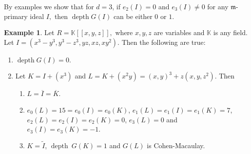 \documentclass[reqno,a4paper,dvipsnames]{amsart}
\newcommand{\kk}{\mathbb{K}}
\newcommand{\depth}{\operatorname{depth}}
\theoremstyle{definition}
\newtheorem{example}[theorem]{Example}
\begin{document}
By  examples we show that  for $d=3$, if $e_2(I)=0$ and $e_3(I) \neq 0$ for any $\mathfrak m$-primary ideal $I,$ then  $\depth G(I)$ can be either $0$ or $1$.  
\begin{example}
\label{e2=0, e3 not 0}
Let  $R =\kk [[x,y,z]],$ where $x,y,z$ are variables and $\mathbb K$ is any field.
   Let $I =  (x^3-y^3,  y^{3}-z^{3}, yz, xz, xy^{2})$. Then the following are true:
   \begin{enumerate} [\normalfont (i)]
     \item
\label{e2=0, e3 not 0-1}        $\depth G(I) = 0$. 

       \item
         \label{e2=0, e3 not 0-2}
       Let $K = I + (x^3) $ and $L = K +  (x^2y) = (x,y)^3 + z(x,y,z^2)$. Then 
   \begin{enumerate}
      \item 
   \label{e2=0, e3 not 0-2-a}
       $L = \overline{I} = \overline{K}$. 
        \item
           \label{e2=0, e3 not 0-2-b}
        $e_0(L) =15 = e_0(I) = e_0(K)$,  $e_1(L)= e_1(I) = e_1(K) = 7 $,  $e_2(L) = e_2(I) = e_2(K)= 0$,  $e_3(L) =0$ and $e_3(I) = e_3(K) =-1$.

        \item
         \label{e2=0, e3 not 0-2-c}
       $K = \widetilde{I}$,   $\depth~G(K)=1$ and  $G(L)$ is Cohen-Macaulay. 
     \end{enumerate}
   \end{enumerate}
  \end{example}
\end{document}
